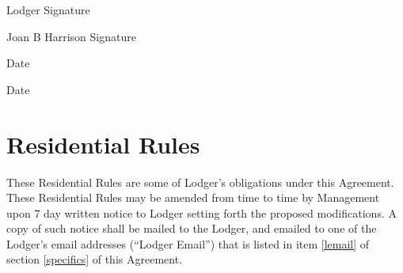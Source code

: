 \documentclass[12pt,letterpaper]{article}
\newcommand{\lodger}{Lodger}
\newcommand{\rules}{Residential Rules}
\newcommand{\mom}{Joan B Harrison}
\newcommand{\management}{Management}
\newcommand{\lemail}{Lodger Email}
\begin{document}
\begin{minipage}[t]{0.65\textwidth}
	\begin{flushright}
		\vspace{1cm}\noindent	\lodger{} Signature\hspace{0.2cm}\makebox[2in]{\hrulefill}

		\vspace{1cm}\noindent	\mom{} Signature\hspace{0.2cm}\makebox[2in]{\hrulefill}
	\end{flushright}
\end{minipage}
\hfill
\begin{minipage}[t]{0.25\textwidth}
	\begin{flushright}
		\vspace{1cm}\noindent Date\hspace{0.2cm}\makebox[2cm]{\hrulefill} 

		\vspace{1cm}\noindent Date\hspace{0.2cm}\makebox[2cm]{\hrulefill} 
	\end{flushright}
\end{minipage}

\newpage
\section{\rules{}} \label{rules}

 These \rules{} are some of \lodger{}'s obligations under this Agreement. These Residential Rules may be amended from time to time by \management{} upon 7 day written notice to \lodger{} setting forth the proposed modifications. A copy of such notice shall be mailed to the \lodger{}, and emailed to one of the \lodger{}'s email addresses (``\lemail{}'') that is listed in item \ref{lemail} of section \ref{specifics} of this Agreement.
\end{document}
